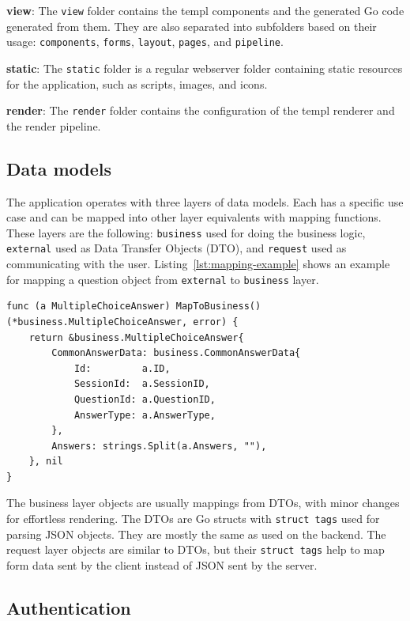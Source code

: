 \textbf{view}: The \texttt{view} folder contains the templ components and the generated Go code generated from them. They are also separated into subfolders based on their usage: \texttt{components}, \texttt{forms}, \texttt{layout}, \texttt{pages}, and \texttt{pipeline}.

\textbf{static}: The \texttt{static} folder is a regular webserver folder containing static resources for the application, such as scripts, images, and icons.

\textbf{render}: The \texttt{render} folder contains the configuration of the templ renderer and the render pipeline.

\subsection{Data models}

The application operates with three layers of data models. Each has a specific use case and can be mapped into other layer equivalents with mapping functions. These layers are the following: \texttt{business} used for doing the business logic, \texttt{external} used as Data Transfer Objects (DTO), and \texttt{request} used as communicating with the user. Listing~\ref{lst:mapping-example} shows an example for mapping a question object from \texttt{external} to \texttt{business} layer.

\begin{lstlisting}[caption=Mapping from external to business,label=lst:mapping-example]
func (a MultipleChoiceAnswer) MapToBusiness() (*business.MultipleChoiceAnswer, error) {
	return &business.MultipleChoiceAnswer{
		CommonAnswerData: business.CommonAnswerData{
			Id:         a.ID,
			SessionId:  a.SessionID,
			QuestionId: a.QuestionID,
			AnswerType: a.AnswerType,
		},
		Answers: strings.Split(a.Answers, ""),
	}, nil
}
\end{lstlisting}

The business layer objects are usually mappings from DTOs, with minor changes for effortless rendering. The DTOs are Go structs with \texttt{struct tags} used for parsing JSON objects. They are mostly the same as used on the backend. The request layer objects are similar to DTOs, but their \texttt{struct tags} help to map form data sent by the client instead of JSON sent by the server.

\subsection{Authentication}\label{subsec:frontend-authentication}

